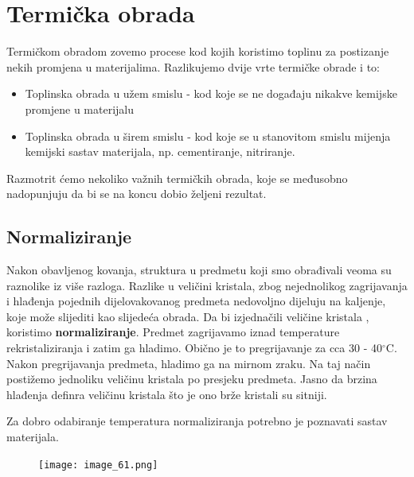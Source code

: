 \documentclass[a4paper,12pt]{article}
\numberwithin{figure}{section}
\begin{document}
\section{Termička obrada}
Termičkom obradom zovemo procese kod kojih koristimo toplinu za postizanje nekih promjena u materijalima. Razlikujemo dvije vrte termičke obrade i to:
\begin{itemize}
\item Toplinska obrada u užem smislu - kod koje se ne događaju nikakve kemijske promjene u materijalu
\item Toplinska obrada u širem smislu - kod koje se u stanovitom smislu mijenja kemijski sastav materijala, np. cementiranje, nitriranje.
\end{itemize}
Razmotrit ćemo nekoliko važnih termičkih obrada, koje se međusobno nadopunjuju da bi se na koncu dobio željeni rezultat.
\subsection{Normaliziranje}
Nakon obavljenog kovanja, struktura u predmetu koji smo obrađivali veoma su raznolike iz više razloga. Razlike u veličini kristala, zbog nejednolikog zagrijavanja i hlađenja pojednih dijelovakovanog predmeta nedovoljno dijeluju na kaljenje, koje može slijediti kao slijedeća obrada. Da bi izjednačili veličine kristala , koristimo \textbf{normaliziranje}. Predmet zagrijavamo iznad temperature rekristaliziranja i zatim ga hladimo. Obično je to pregrijavanje za cca 30 - 40$^{\circ}$C. Nakon pregrijavanja predmeta, hladimo ga na mirnom zraku. Na taj način postižemo jednoliku veličinu kristala po presjeku predmeta. Jasno da brzina hlađenja definra veličinu kristala što je ono brže kristali su sitniji. \par
Za dobro odabiranje temperatura normaliziranja potrebno je poznavati sastav materijala.
\begin{figure}[!h]
\centering
\texttt{[image: image\_61.png]}
\end{figure}
\FloatBarrier
\end{document}
